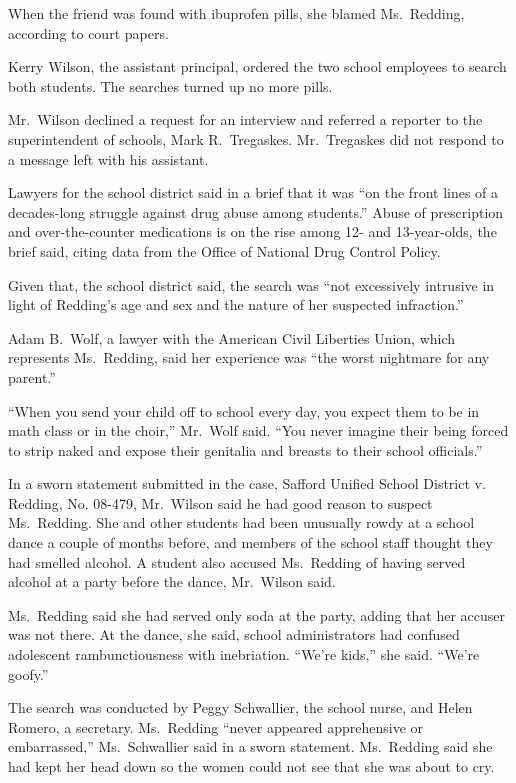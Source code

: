 \documentclass[12pt,a4paper,onecolumn]{article}
\begin{document}
\begin{CJK*}{GBK}{song}
When the friend was found with ibuprofen pills, she blamed Ms.~Redding, according to court papers.

Kerry Wilson, the assistant principal, ordered the two school employees to search both students. The
searches turned up no more pills.

Mr.~Wilson declined a request for an interview and referred a reporter to the superintendent of
schools, Mark R.~Tregaskes. Mr.~Tregaskes did not respond to a message left with his assistant.

Lawyers for the school district said in a brief that it was ``on the front lines of a decades-long
struggle against drug abuse among students.'' Abuse of prescription and over-the-counter medications
is on the rise among 12- and 13-year-olds, the brief said, citing data from the Office of National
Drug Control Policy.

Given that, the school district said, the search was ``not excessively intrusive in light of
Redding's age and sex and the nature of her suspected infraction.''

Adam B.~Wolf, a lawyer with the American Civil Liberties Union, which represents Ms.~Redding, said
her experience was ``the worst nightmare for any parent.''

``When you send your child off to school every day, you expect them to be in math class or in the
choir,'' Mr.~Wolf said. ``You never imagine their being forced to strip naked and expose their
genitalia and breasts to their school officials.''

In a sworn statement submitted in the case, Safford Unified School District v. Redding, No. 08-479,
Mr.~Wilson said he had good reason to suspect Ms.~Redding. She and other students had been unusually
rowdy at a school dance a couple of months before, and members of the school staff thought they had
smelled alcohol. A student also accused Ms.~Redding of having served alcohol at a party before the
dance, Mr.~Wilson said.

Ms.~Redding said she had served only soda at the party, adding that her accuser was not there. At
the dance, she said, school administrators had confused adolescent rambunctiousness with
inebriation. ``We're kids,'' she said. ``We're goofy.''

The search was conducted by Peggy Schwallier, the school nurse, and Helen Romero, a secretary.
Ms.~Redding ``never appeared apprehensive or embarrassed,'' Ms.~Schwallier said in a sworn
statement. Ms.~Redding said she had kept her head down so the women could not see that she was about
to cry.


\end{CJK*}
\end{document}
